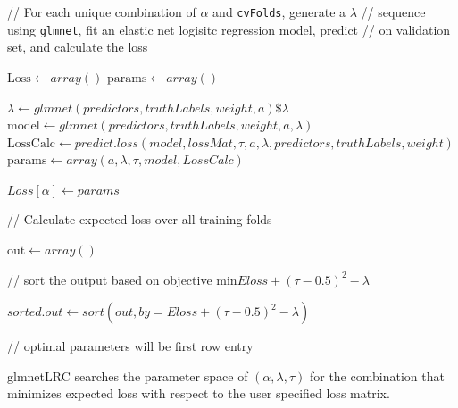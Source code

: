 \documentclass{article}
\begin{document}
\begin{algorithm} \label{glmnetLRC}

      

// For each unique combination of $\alpha$ and {\tt cvFolds}, generate a $\lambda$ 
// sequence using {\tt glmnet}, fit an elastic net logisitc regression model, predict 
// on validation set, and calculate the loss

$ \textrm{Loss} \gets array() $\;
$ \textrm{params} \gets array() $\;
 {
   {
  
    $\lambda \gets glmnet(predictors, truthLabels, weight, a)\$\lambda $\;
    $\textrm{model} \gets glmnet(predictors, truthLabels, weight, a, \lambda) $\;
    $\textrm{LossCalc} \gets predict.loss(model, lossMat, \tau, a, \lambda,
    predictors, truthLabels, weight) $\;
    $\textrm{params} \gets array(a, \lambda, \tau, model, LossCalc) $\;
    
  }
  
  $ Loss[ \alpha ] \gets params $\; 
  
}

// Calculate expected loss over all training folds \; 

$\textrm{out} \gets array() $\;


// sort the output based on objective $\textrm{min} Eloss + (\tau - 0.5)^{2} - \lambda$

$sorted.out \gets sort(out, by = Eloss + (\tau - 0.5)^{2} - \lambda) $\;

// optimal parameters will be first row entry
	
\caption{{\sc glmnetLRC} searches the parameter space of $(\alpha, \lambda, \tau)$ for the 
combination that minimizes expected loss with respect to the user specified loss matrix.}
\end{algorithm}  


\nocite{*}

	
\end{document}
